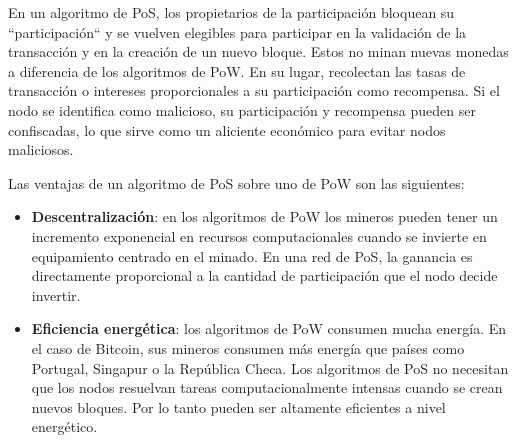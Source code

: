 En un algoritmo de \ac{PoS}, los propietarios de la participación bloquean su ``participación`` y se vuelven elegibles para participar en la validación de la transacción y en la creación de un nuevo bloque. Estos no minan nuevas monedas a diferencia de los algoritmos de \ac{PoW}. En su lugar, recolectan las tasas de transacción o intereses proporcionales a su participación como recompensa. Si el nodo se identifica como malicioso, su participación y recompensa pueden ser confiscadas, lo que sirve como un aliciente económico para evitar nodos maliciosos.

Las ventajas de un algoritmo de \ac{PoS} sobre uno de \ac{PoW} son las siguientes:
\begin{itemize}
    \item \textbf{Descentralización}: en los algoritmos de \ac{PoW} los mineros pueden tener un incremento exponencial en recursos computacionales cuando se invierte en equipamiento centrado en el minado. En una red de \ac{PoS}, la ganancia es directamente proporcional a la cantidad de participación que el nodo decide invertir.
    \item \textbf{Eficiencia energética}: los algoritmos de \ac{PoW} consumen mucha energía. En el caso de Bitcoin, sus mineros consumen más energía que países como Portugal, Singapur o la República Checa. Los algoritmos de \ac{PoS} no necesitan que los nodos resuelvan tareas computacionalmente intensas cuando se crean nuevos bloques. Por lo tanto pueden ser altamente eficientes a nivel energético.
\end{itemize}